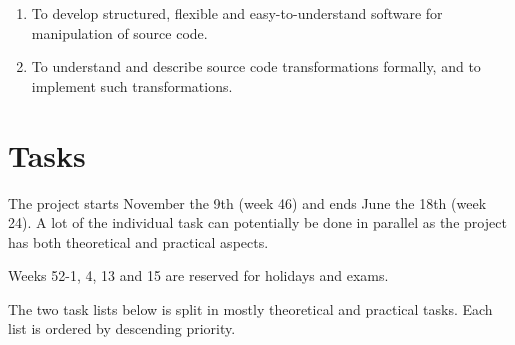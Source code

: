 \documentclass[a4paper,oneside]{article}
\begin{document}
\begin{enumerate}
\item To develop structured, flexible and easy-to-understand software for manipulation of source code.
\item To understand and describe source code transformations formally, and to implement such
  transformations.
\end{enumerate}


\section{Tasks}

The project starts November the 9th (week 46) and ends June the 18th (week
24). A lot of the individual task can potentially be done in parallel as the
project has both theoretical and practical aspects.

Weeks 52-1, 4, 13 and 15 are reserved for holidays and exams.

The two task lists below is split in mostly theoretical and practical tasks. Each list is ordered by
descending priority.
\end{document}
